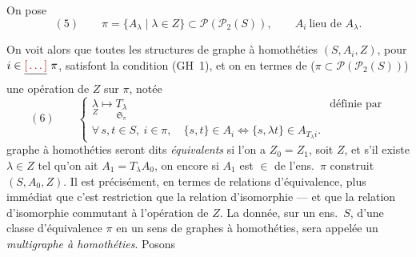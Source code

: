 \documentclass[11pt,a4paper]{article}
\begin{document}
 On pose
\[
(5) \qquad \pi = \{ A_\lambda \mid \lambda \in Z \} \subset \mathcal{P}(\mathcal{P}_2(S)) , \qquad A_i \ \text{lieu de } A_\lambda .
\]

On voit alors que toutes les structures de graphe à homothéties $(S, A_i, Z)$, pour $i \in \struck{\ill{}}\ \pi$, satisfont la condition (GH~1), et on    en termes de  ($\pi \subset \mathcal{P}(\mathcal{P}_2(S))$) une opération de $Z$ sur $\pi$, notée
\[
(6) \qquad \begin{cases} \underset{Z}{\lambda} \longmapsto \underset{\mathfrak{S}_\pi}{T_\lambda} & \text{définie par} \\ \forall\, s, t \in S,\ i \in \pi, \quad \{s, t\} \in A_i \iff \{s, \lambda t\} \in A_{T_\lambda i} . \end{cases}
\]
   graphe à homothéties      seront dits \emph{équivalents} si l'on a $Z_0 = Z_1$, soit $Z$, et s'il existe $\lambda \in Z$ tel qu'on ait $A_1 = T_\lambda A_0$, \struck{\ill{}} on encore si $A_1$ est $\in$ de l'ens.\ $\pi$ construit  $(S, A_0, Z)$. Il est précisément, en termes de relations   d'équivalence, plus immédiat que c'est  restriction que la relation d'isomorphie — et  que la relation d'isomorphie commutant à l'opération de $Z$. La donnée, \struck{\ill{}} sur un ens.\ $S$, d'une classe d'équivalence $\pi$ en un sens de graphes à homothéties, sera appelée un \emph{multigraphe à homothéties}. Posons
\end{document}
